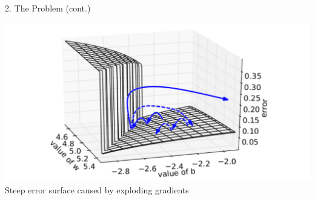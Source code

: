 \documentclass[final]{beamer}
\begin{document}
\begin{frame}[t]
\begin{columns}[t,totalwidth=\textwidth]
\begin{column}{0.3\textwidth}
\begin{block}{2. The Problem (cont.)}
    \begin{center}
\begin{minipage}[t]{0.48\linewidth}
    \centering
    \includegraphics[width=\linewidth]{figures/geometric.png} \\
    \small Steep error surface caused by exploding gradients
\end{minipage}
\end{center}


    \end{block}




 
        

\end{column}
\end{columns}
\end{frame}
\end{document}
